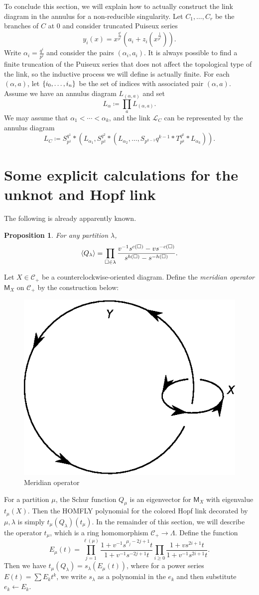 \documentclass{amsart}
\newtheorem{prop}[thm]{Proposition}
\theoremstyle{definition}
\theoremstyle{remark}
\theoremstyle{plain}
\theoremstyle{definition}
\theoremstyle{remark}
\newcommand{\mc}[1]{\mathcal{#1}}
\newcommand{\ms}[1]{\mathsf{#1}}
\newcommand{\1}{\mathbf{1}}
\newcommand{\2}{\mathbf{2}}
\newcommand{\3}{\mathbf{3}}
\begin{document}
To conclude this section, we will explain how to actually construct the link diagram in the annulus for a non-reducible singularity. Let $C_1, \ldots, C_r$ be the branches of $C$ at $0$ and consider truncated Puiseux series
\[ y_i(x) = x^{\frac{q^i}{p^i}} (a_i + z_i(x^{\frac{1}{p^i}})). \]
Write $\alpha_i = \frac{q^i}{p^i}$ and consider the pairs $(\alpha_i, a_i)$. It is always possible to find a finite truncation of the Puiseux series that does not affect the topological type of the link, so the inductive process we will define is actually finite. For each $(\alpha, a)$, let $\qty{i_0, \ldots, i_n}$ be the set of indices with associated pair $(\alpha, a)$. Assume we have an annulus diagram $L_{(\alpha, a)}$ and set
\[ L_{\alpha} \coloneqq \prod_a L_{(\alpha, a)}. \]
We may assume that $\alpha_1 < \cdots < \alpha_k$, and the link $\mc{L}_C$ can be represented by the annulus diagram
\[ L_C \coloneqq S_{p^1}^{q^1} * (L_{\alpha_1}, S_{p^2}^{q^2} * (L_{\alpha_2}, \ldots, S_{p^{k-1}}{q^{k-1}} * T_{p^k}^{q^k} * L_{\alpha_k})). \]

\section{Some explicit calculations for the unknot and Hopf link}%
\label{sec:some_explicit_calculations_for_the_unknot_and_hopf_link}

The following is already apparently known.
\begin{prop}
    For any partition $\lambda$, 
    \[ \ev{Q_{\lambda}} = \prod_{\square \in \lambda} \frac{v^{-1} s^{c(\square)} - v s^{-c(\square)}}{s^{h(\square)} - s^{-h(\square)}}. \]
\end{prop}

Let $X \in \mc{C}_+$ be a counterclockwise-oriented diagram. Define the \textit{meridian operator} $\ms{M}_X$ on $\mc{C}_+$ by the construction below:
\begin{figure}[H]
    \centering
    \includegraphics[width=0.2\linewidth]{mer6.eps}
    \caption{Meridian operator}%
    \label{fig:mer6}
\end{figure}
For a partition $\mu$, the Schur function $Q_{\mu}$ is an eigenvector for $\ms{M}_X$ with eigenvalue $t_{\mu}(X)$. Then the HOMFLY polynomial for the colored Hopf link decorated by $\mu, \lambda$ is simply $t_{\mu}(Q_{\lambda})(t_{\mu})$. In the remainder of this section, we will describe the operator $t_{\mu}$, which is a ring homomorphism $\mc{C}_+ \to \Lambda$. Define the function
\[ E_{\mu}(t) = \prod_{j=1}^{\ell(\mu)} \frac{1+v^{-1}s^{\mu_j - 2j + 1}t}{1+v^{-1}s^{-2j+1}t} \prod_{i \geq 0} \frac{1+v s^{2i+1}t}{1+v^{-1}s^{2i+1}t}. \]
Then we have $t_{\mu}(Q_{\lambda}) = s_{\lambda}(E_{\mu}(t))$, where for a power series $E(t) = \sum E_k t^k$, we write $s_{\lambda}$ as a polynomial in the $e_k$ and then substitute $e_k \gets E_k$.
\end{document}
